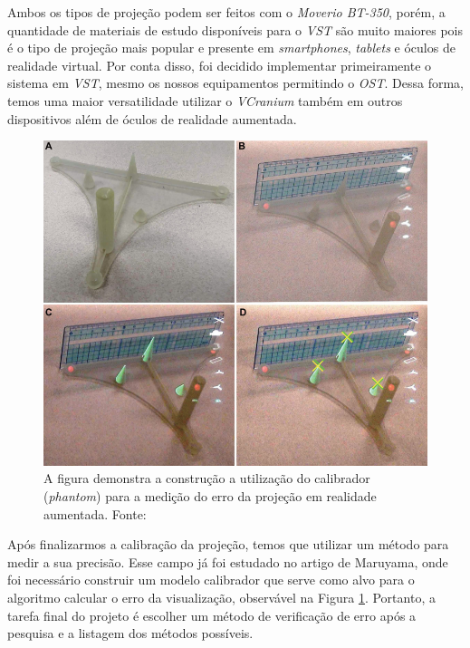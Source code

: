 Ambos os tipos de projeção podem ser feitos com o \textit{Moverio BT-350}, porém, a quantidade de materiais de estudo disponíveis para o \textit{VST} são muito maiores pois é o tipo de projeção mais popular e presente em \textit{smartphones}, \textit{tablets} e óculos de realidade virtual. Por conta disso, foi decidido implementar primeiramente o sistema em \textit{VST}, mesmo os nossos equipamentos permitindo o \textit{OST}. Dessa forma, temos uma maior versatilidade utilizar o \textit{VCranium} também em outros dispositivos além de óculos de realidade aumentada.

\begin{figure}[H]
   \centering
   \includegraphics[width=.65\linewidth]{figuras/phantom.png}
   \caption{A figura demonstra a construção a utilização do calibrador (\textit{phantom}) para a medição do erro da projeção em realidade aumentada. Fonte: \cite{Maruyama2018}}
   \label{fig:phantom}
\end{figure}

Após finalizarmos a calibração da projeção, temos que utilizar um método para medir a sua precisão. Esse campo já foi estudado no artigo de Maruyama, onde foi necessário construir um modelo calibrador que serve como alvo para o algoritmo calcular o erro da visualização, observável na Figura \ref{fig:phantom}. Portanto, a tarefa final do projeto é escolher um método de verificação de erro após a pesquisa e a listagem dos métodos possíveis.